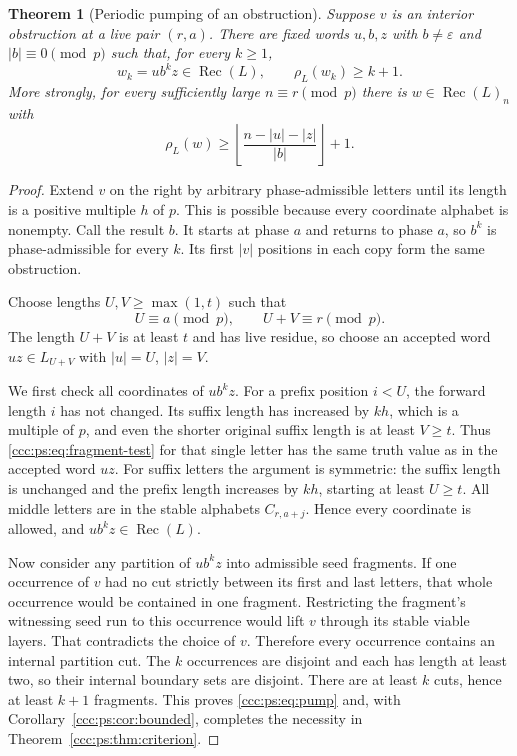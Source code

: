 \documentclass[11pt,letterpaper]{article}
\newtheorem{theorem}{Theorem}[section]
\theoremstyle{definition}
\theoremstyle{remark}
\newcommand{\eps}{\varepsilon}
\newcommand{\rec}{\operatorname{Rec}}
\newcommand{\rank}{\rho}
\begin{document}
\begin{theorem}[Periodic pumping of an obstruction]\label{ccc:ps:thm:pumping}
Suppose $v$ is an interior obstruction at a live pair $(r,a)$.
There are fixed words $u,b,z$ with $b\ne\eps$ and $|b|\equiv0\pmod p$
such that, for every $k\ge1$,
\begin{equation}\label{ccc:ps:eq:pump}
 w_k=ub^kz\in\rec(L),\qquad \rank_L(w_k)\ge k+1.
\end{equation}
More strongly, for every sufficiently large $n\equiv r\pmod p$ there is
$w\in\rec(L)_n$ with
\begin{equation}\label{ccc:ps:eq:all-large-lower}
 \rank_L(w)\ge
 \left\lfloor\frac{n-|u|-|z|}{|b|}\right\rfloor+1.
\end{equation}
\end{theorem}
\begin{proof}
Extend $v$ on the right by arbitrary phase-admissible letters until its
length is a positive multiple $h$ of $p$. This is possible because every
coordinate alphabet is nonempty. Call the result $b$. It starts at phase
$a$ and returns to phase $a$, so $b^k$ is phase-admissible for every $k$.
Its first $|v|$ positions in each copy form the same obstruction.

Choose lengths $U,V\ge\max(1,t)$ such that
\[
 U\equiv a\pmod p,\qquad U+V\equiv r\pmod p.
\]
The length $U+V$ is at least $t$ and has live residue, so choose an
accepted word $uz\in L_{U+V}$ with $|u|=U$, $|z|=V$.

We first check all coordinates of $ub^kz$. For a prefix position $i<U$,
the forward length $i$ has not changed. Its suffix length has increased
by $kh$, which is a multiple of $p$, and even the shorter original suffix
length is at least $V\ge t$. Thus \eqref{ccc:ps:eq:fragment-test} for that
single letter has the same truth value as in the accepted word $uz$.
For suffix letters the argument is symmetric: the suffix length is
unchanged and the prefix length increases by $kh$, starting at least
$U\ge t$. All middle letters are in the stable alphabets
$C_{r,a+j}$. Hence every coordinate is allowed, and
$ub^kz\in\rec(L)$.

Now consider any partition of $ub^kz$ into admissible seed fragments.
If one occurrence of $v$ had no cut strictly between its first and last
letters, that whole occurrence would be contained in one fragment.
Restricting the fragment's witnessing seed run to this occurrence would
lift $v$ through its stable viable layers. That contradicts the choice
of $v$. Therefore every occurrence contains an internal partition cut.
The $k$ occurrences are disjoint and each has length at least two, so
their internal boundary sets are disjoint. There are at least $k$ cuts,
hence at least $k+1$ fragments. This proves \eqref{ccc:ps:eq:pump} and, with
Corollary~\ref{ccc:ps:cor:bounded}, completes the necessity in
Theorem~\ref{ccc:ps:thm:criterion}.


\end{proof}
\end{document}
